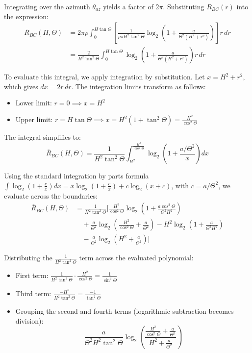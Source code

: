 \documentclass[11pt,a4paper]{article}
\begin{document}
        Integrating over the azimuth $\theta_{az}$ yields a factor of $2\pi$. Substituting $R_{BC}(r)$ into the expression:
        \begin{align*}
        \overline{R}_{BC}(H, \Theta) &= 2\pi \rho \int_{0}^{H \tan\Theta} \left[ \frac{1}{\rho \pi H^2 \tan^2\Theta} \log_2\left(1 + \frac{a}{\Theta^2(H^2 + r^2)}\right) \right] r \, dr \\
        &= \frac{2}{H^2 \tan^2\Theta} \int_{0}^{H \tan\Theta} \log_2\left(1 + \frac{a}{\Theta^2(H^2 + r^2)}\right) r \, dr
        \end{align*}

        To evaluate this integral, we apply integration by substitution. Let $x = H^2 + r^2$, which gives $dx = 2r \, dr$.
        The integration limits transform as follows:
        \begin{itemize}
            \item Lower limit: $r = 0 \implies x = H^2$
            \item Upper limit: $r = H \tan\Theta \implies x = H^2(1 + \tan^2\Theta) = \frac{H^2}{\cos^2\Theta}$
        \end{itemize}

        The integral simplifies to:
        $$\overline{R}_{BC}(H, \Theta) = \frac{1}{H^2 \tan^2\Theta} \int_{H^2}^{\frac{H^2}{\cos^2\Theta}} \log_2\left(1 + \frac{a/\Theta^2}{x}\right) dx$$

        Using the standard integration by parts formula $\int \log_2(1 + \frac{c}{x}) dx = x \log_2(1 + \frac{c}{x}) + c \log_2(x+c)$, with $c = a/\Theta^2$, we evaluate across the boundaries:
        \begin{align*}
        \overline{R}_{BC}(H, \Theta) &= \frac{1}{H^2 \tan^2\Theta} \Bigg[ \frac{H^2}{\cos^2\Theta}\log_2\left(1 + \frac{a \cos^2\Theta}{\Theta^2 H^2}\right) \\
        &\quad + \frac{a}{\Theta^2}\log_2\left(\frac{H^2}{\cos^2\Theta} + \frac{a}{\Theta^2}\right) - H^2\log_2\left(1 + \frac{a}{\Theta^2 H^2}\right) \\
        &\quad - \frac{a}{\Theta^2}\log_2\left(H^2 + \frac{a}{\Theta^2}\right) \Bigg]
        \end{align*}

        Distributing the $\frac{1}{H^2 \tan^2\Theta}$ term across the evaluated polynomial:
        \begin{itemize}
            \item First term: $\frac{1}{H^2 \tan^2\Theta} \cdot \frac{H^2}{\cos^2\Theta} = \frac{1}{\sin^2\Theta}$
            \item Third term: $\frac{-H^2}{H^2 \tan^2\Theta} = \frac{-1}{\tan^2\Theta}$
            \item Grouping the second and fourth terms (logarithmic subtraction becomes division):
            $$\frac{a}{\Theta^2 H^2 \tan^2\Theta} \log_2\left( \frac{\frac{H^2}{\cos^2\Theta} + \frac{a}{\Theta^2}}{H^2 + \frac{a}{\Theta^2}} \right)$$
        \end{itemize}
\end{document}
